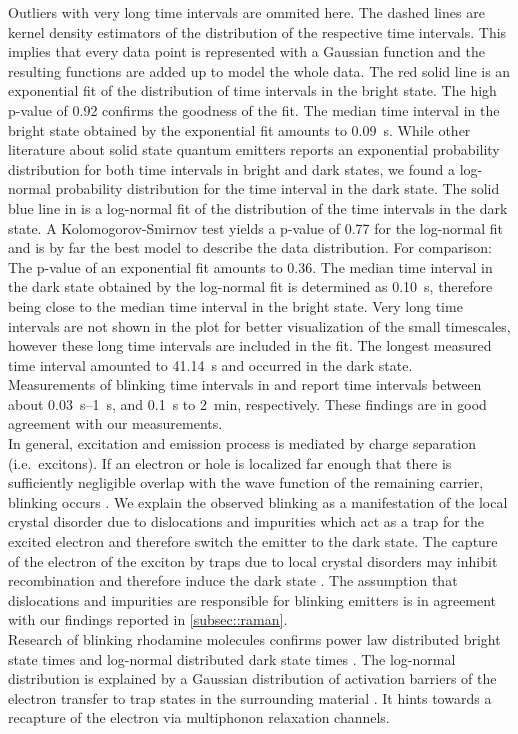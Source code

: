 		Outliers with very long time intervals are ommited here.
		The dashed lines are kernel density estimators of the distribution of the respective time intervals.
		This implies that every data point is represented with a Gaussian function and the resulting functions are added up to model the whole data.
		The red solid line is an exponential fit of the distribution of time intervals in the bright state.
		The high p-value of \num{0.92} confirms the goodness of the fit.
		The median time interval in the bright state obtained by the exponential fit amounts to \SI[separate-uncertainty]{0.09}{s}.
		While other literature about solid state quantum emitters reports an exponential probability distribution for both time intervals in bright and dark states\cite{Bradac2010,Berhane2017}, we found a log-normal probability distribution for the time interval in the dark state.
		The solid blue line in  is a log-normal fit of the distribution of the time intervals in the dark state.
		A Kolomogorov-Smirnov test yields a p-value of \num{0.77} for the log-normal fit and is by far the best model to describe the data distribution.
		For comparison: The p-value of an exponential fit amounts to \num{0.36}.
		The median time interval in the dark state obtained by the log-normal fit is determined as \SI{0.10}{s}, therefore being close to the median time interval in the bright state.
		Very long time intervals are not shown in the plot for better visualization of the small timescales, however these long time intervals are included in the fit.
		The longest measured time interval amounted to \SI{41.14}{s} and occurred in the dark state.
		\\
		Measurements of blinking time intervals in \cite{Jantzen2016} and \cite{Neu2012a} report time intervals between about \SIrange{0.03}{1}{s}, and \SI{0.1}{s} to \SI{2}{min}, respectively.
		These findings are in good agreement with our measurements.
		\\
		In general, excitation and emission process is mediated by charge separation (i.e.\ excitons).
		If an electron or hole is localized far enough that there is sufficiently negligible overlap with the wave function of the remaining carrier, blinking occurs \cite{Efros2016}.
		We explain the observed blinking as a manifestation of the local crystal disorder due to dislocations and impurities which act as a trap for the excited electron and therefore switch the emitter to the dark state.
		The capture of the electron of the exciton by traps due to local crystal disorders may inhibit recombination and therefore induce the dark state \cite{Bradac2010}.
		The assumption that dislocations and impurities are responsible for blinking emitters is in agreement with our findings reported in \ref{subsec::raman}.
		\\
		Research of blinking rhodamine molecules confirms power law distributed bright state times and log-normal distributed dark state times \cite{Wong2013}.
		The log-normal distribution is explained by a Gaussian distribution of activation barriers of the electron transfer to trap states in the surrounding material \cite{Albery1985}.
		It hints towards a recapture of the electron via multiphonon relaxation channels.

